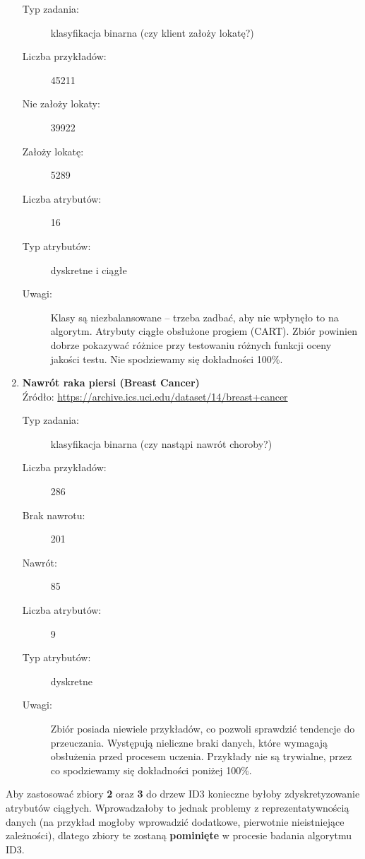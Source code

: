 \documentclass[a4paper]{article}
\begin{document}
\begin{enumerate}
    \begin{description}
        \item[Typ zadania:] klasyfikacja binarna (czy klient założy lokatę?)
        \item[Liczba przykładów:] 45211
        \item[Nie założy lokaty:] 39922
        \item[Założy lokatę:] 5289
        \item[Liczba atrybutów:] 16
        \item[Typ atrybutów:] dyskretne i ciągłe
        \item[Uwagi:] Klasy są niezbalansowane -- trzeba zadbać, aby nie wpłynęło to na algorytm. Atrybuty ciągłe obsłużone progiem (CART). Zbiór powinien dobrze pokazywać różnice przy testowaniu różnych funkcji oceny jakości testu. Nie spodziewamy się dokładności 100\%.
    \end{description}

    \item \textbf{Nawrót raka piersi (Breast Cancer)} \\
    Źródło: \url{https://archive.ics.uci.edu/dataset/14/breast+cancer}

    \begin{description}
        \item[Typ zadania:] klasyfikacja binarna (czy nastąpi nawrót choroby?)
        \item[Liczba przykładów:] 286
        \item[Brak nawrotu:] 201
        \item[Nawrót:] 85
        \item[Liczba atrybutów:] 9
        \item[Typ atrybutów:] dyskretne
        \item[Uwagi:] Zbiór posiada niewiele przykładów, co pozwoli sprawdzić tendencje do przeuczania. Występują nieliczne braki danych, które wymagają obsłużenia przed procesem uczenia. Przykłady nie są trywialne, przez co spodziewamy się dokładności poniżej 100\%.
    \end{description}
\end{enumerate}



    Aby zastosować zbiory \textbf{2} oraz \textbf{3} do drzew ID3 konieczne byłoby zdyskretyzowanie atrybutów ciągłych. Wprowadzałoby to jednak problemy z reprezentatywnością danych (na przykład mogłoby wprowadzić dodatkowe, pierwotnie nieistniejące zależności), dlatego zbiory te zostaną \textbf{pominięte} w procesie badania algorytmu ID3.
\end{document}
